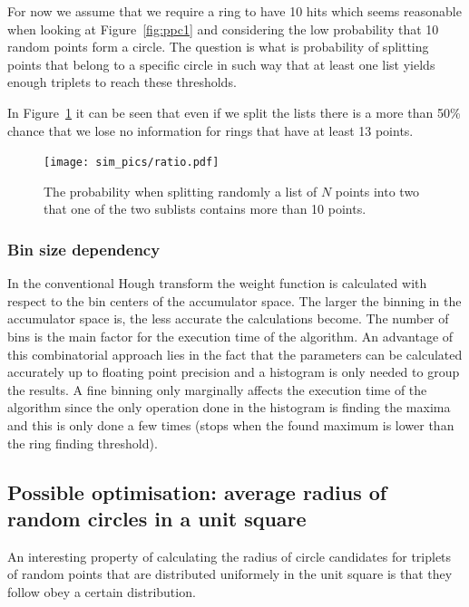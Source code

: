 \documentclass[11pt]{scrreprt}
\begin{document}
For now we assume that we require a ring to have 10 hits which seems reasonable when looking at Figure~\ref{fig:ppc1} and considering the low probability that 10 random points form a circle. The question is what is probability of splitting points that belong to a specific circle in such way that at least one list yields enough triplets to reach these thresholds.

In Figure~\ref{fig:ratios} it can be seen that even if we split the lists there is a more 
than 50\% chance that we lose no information for rings that have at least 13 points.
\begin{figure}[htb]
  \centering
  \texttt{[image: sim\_pics/ratio.pdf]}
  \caption{The probability when splitting randomly a list of $N$ points into two that one of the two sublists contains more than 10 points.}
  \label{fig:ratios}
\end{figure}

\subsubsection{Bin size dependency} %
\label{ssub:bin_size_dependency}
In the conventional Hough transform the weight function is calculated with respect to the bin centers of the accumulator space. The larger the binning in the accumulator space  is, the less accurate the calculations become. 
The number of bins is the main factor for the execution time of the algorithm. An advantage of this combinatorial approach lies in the 
fact that the parameters can be calculated accurately up to floating point precision and a histogram is only needed to group the results. 
A fine binning only marginally affects the execution time of the algorithm since the only operation done in the histogram is finding the 
maxima and this is only done a few times (stops when the found maximum is lower than the ring finding threshold).


\subsection{Possible optimisation: average radius of random circles in a unit square} %
\label{ssub:average_radius_of_random_circles_in_a_unit_square}
An interesting property of calculating the radius of circle candidates for triplets of random points that are distributed uniformely in the unit square is 
that they follow obey a certain distribution.
\end{document}

